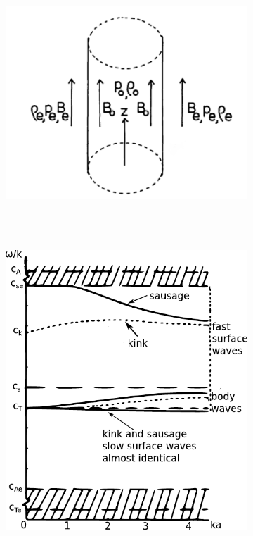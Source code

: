     \begin{figure}
        \centering
        \begin{subfigure}[b]{0.75\textwidth}
            \includegraphics[width=\textwidth]{Fluxtube}
        \end{subfigure}\\~\\
        \begin{subfigure}[b]{0.65\textwidth}
            \includegraphics[width=\textwidth]{dispersion}

\end{subfigure}
\end{figure}
